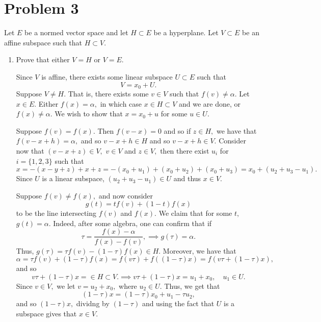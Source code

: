\documentclass[11pt]{article}
\begin{document}
\begin{problem}
\begin{enumerate}
\end{enumerate}

\newpage
\section*{Problem 3}
\begin{problem}
    Let $E$ be a normed vector space and let $H\subset E$ be a hyperplane. Let $V\subset E$ be an affine subspace such that $H\subset V.$
\end{problem}
\begin{enumerate}
    \item Prove that either $V = H$ or $V = E.$
    \begin{solution}
    Since $V$ is affine, there exists some linear subspace $U\subset E$ such that 
    \[V = x_0 + U.\]
        Suppose $V\neq H.$ That is, there exists some $v\in V$ such that $f(v) \neq \alpha.$ Let $x \in E.$ Either $f(x) = \alpha,$ in which case $x\in H \subset V$ and we are done, or $f(x) \neq \alpha.$ We wish to show that $x = x_0 + u$ for some $u\in U.$ 

        Suppose $f(v) = f(x).$ Then $f(v - x) = 0$ and so if $z\in H,$ we have that $f(v - x + h) = \alpha,$ and so $v-x + h \in H$ and so $v- x + h \in V.$  Consider now that $(v-x + z) \in V,$ $v\in V$ and  $z\in V,$ then there exist $u_{i}$ for $i = \{1,2,3\}$ such that
        \[x = -(x - y + z) + x + z = -(x_0 + u_1) + (x_0 + u_2) + (x_0 + u_3) = x_0 + (u_2 + u_3 - u_1).\] Since $U$ is a linear subspace, $(u_2 + u_3 - u_1)\in U$ and thus $x\in V.$

        Suppose $f(v) \neq f(x),$ and now consider 
        \[g(t) = tf(v) + (1-t)f(x)\] to be the line intersecting $f(v)$ and $f(x).$ We claim that for some $t,$ $g(t) = \alpha.$ Indeed, after some algebra, one can confirm that if 
        \[\tau = \frac{f(x) - \alpha}{f(x) - f(v)}, \implies g(\tau)= \alpha.\] Thus, $g(\tau) = \tau f(v) - (1-\tau)f(x)\in H.$ Moreover, we have that 
        \[\alpha = \tau f(v) + (1-\tau)f(x) = f(v\tau) + f((1-\tau)x) = f(v\tau + (1-\tau)x),\] and so 
        \[v\tau + (1-\tau)x = \in H \subset V. \implies v\tau + (1-\tau)x = u_1 + x_0, \quad u_1 \in U.\] Since $v\in V,$ we let $v = u_2 + x_0,$ where $u_2 \in U.$ Thus, we get that 
        \[(1-\tau)x = (1-\tau)x_0 + u_1 - \tau u_2,\] and so $(1-\tau)x,$ dividng by $(1-\tau)$ and using the fact that $U$ is a subspace gives that $x\in V.$ 


\end{solution}
\end{enumerate}
\end{problem}
\end{document}

